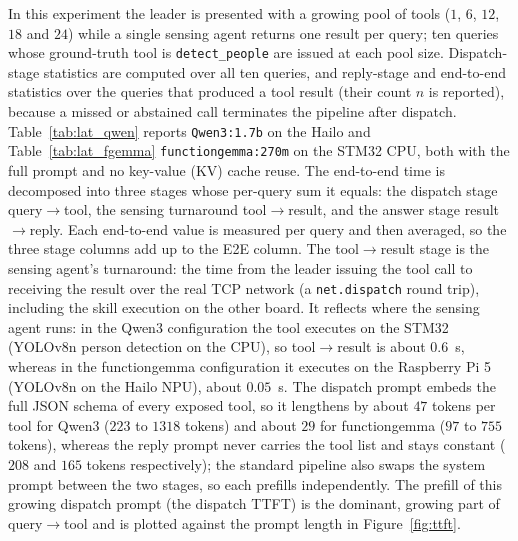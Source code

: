 In this experiment the leader is presented with a growing pool of tools
($1$, $6$, $12$, $18$ and $24$) while a single sensing agent returns one result per
query; ten queries whose ground-truth tool is \texttt{detect\_people} are issued at
each pool size. Dispatch-stage statistics are computed over all ten queries, and
reply-stage and end-to-end statistics over the queries that produced a tool result
(their count $n$ is reported), because a missed or abstained call terminates the
pipeline after dispatch. Table~\ref{tab:lat_qwen} reports \texttt{Qwen3:1.7b} on
the Hailo and Table~\ref{tab:lat_fgemma} \texttt{functiongemma:270m} on the STM32
CPU, both with the full prompt and no key-value (KV) cache reuse. The end-to-end
time is decomposed into three stages whose per-query sum it equals: the dispatch
stage query$\rightarrow$tool, the sensing turnaround tool$\rightarrow$result, and
the answer stage result$\rightarrow$reply. Each end-to-end value is measured per
query and then averaged, so the three stage columns add up to the E2E column. The
tool$\rightarrow$result stage is the sensing agent's turnaround: the time from the
leader issuing the tool call to receiving the result over the real TCP network (a
\texttt{net.dispatch} round trip), including the skill execution on the other board.
It reflects where the sensing agent runs: in the Qwen3 configuration the tool
executes on the STM32 (YOLOv8n person detection on the CPU), so
tool$\rightarrow$result is about $0.6$~s, whereas in the functiongemma configuration
it executes on the Raspberry Pi 5 (YOLOv8n on the Hailo NPU), about $0.05$~s. The
dispatch prompt embeds the full JSON schema of every exposed tool, so it lengthens
by about $47$ tokens per tool for Qwen3 ($223$ to $1318$ tokens) and about $29$ for
functiongemma ($97$ to $755$ tokens), whereas the reply prompt never carries the
tool list and stays constant ($208$ and $165$ tokens respectively); the standard
pipeline also swaps the system prompt between the two stages, so each prefills
independently. The prefill of this growing dispatch prompt (the dispatch TTFT) is
the dominant, growing part of query$\rightarrow$tool and is plotted against the
prompt length in Figure~\ref{fig:ttft}.

